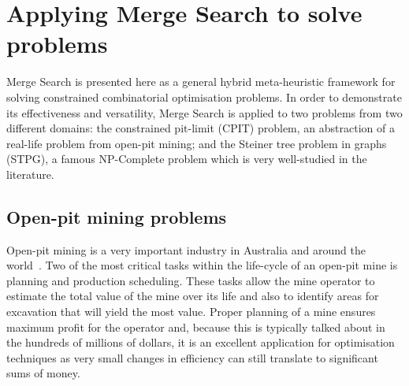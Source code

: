 \documentclass[journal]{IEEEtran}
\begin{document}


\section{Applying Merge Search to solve problems}
Merge Search is presented here as a general hybrid meta-heuristic framework for solving constrained combinatorial optimisation problems. In order to demonstrate its effectiveness and versatility, Merge Search is applied to two problems from two different domains: the constrained pit-limit (CPIT) problem, an abstraction of a real-life problem from open-pit mining; and the Steiner tree problem in graphs (STPG), a famous NP-Complete problem which is very well-studied in the literature.

\subsection{Open-pit mining problems}
Open-pit mining is a very important industry in Australia and around the world~\cite{singh}. Two of the most critical tasks within the life-cycle of an open-pit mine is planning and production scheduling. These tasks allow the mine operator to estimate the total value of the mine over its life and also to identify areas for excavation that will yield the most value. Proper planning of a mine ensures maximum profit for the operator and, because this is typically talked about in the hundreds of millions of dollars, it is an excellent application for optimisation techniques as very small changes in efficiency can still translate to significant sums of money.\par
\end{document}

